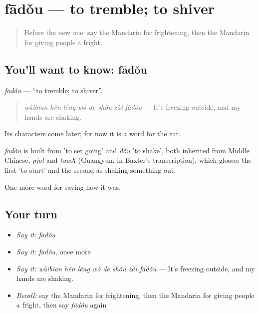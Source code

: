 \section[fādǒu]{fādǒu — to tremble; to shiver}

\label{lesson:ZH-C463-fadou}



\begin{quote}
Before the new one: say the Mandarin for frightening, then the Mandarin for giving people a fright.
\end{quote}

\subsection*{You'll want to know: fādǒu}
\emph{fādǒu} — \textquotedblleft{}to tremble; to shiver\textquotedblright{}.

\begin{quote}
\emph{wàibian hěn lěng wǒ de shǒu zài fādǒu} — It's freezing outside, and my hands are shaking.
\end{quote}

Its characters come later; for now it is a word for the ear.

\begin{cousinweb}
\emph{fādǒu} is built from  'to set going' and \emph{dǒu} 'to shake', both inherited from Middle Chinese, \emph{pjot} and \emph{tuwX} (Guangyun, in Baxter's transcription), which glosses the first 'to start' and the second as shaking something out.
\end{cousinweb}

\begin{grammarlens}[title={What you've built}]
One more word for saying how it was.
\end{grammarlens}

\subsection*{Your turn}
\begin{itemize}
\raggedright
  \item \emph{Say it:} \emph{fādǒu}
  \item \emph{Say it:} \emph{fādǒu}, once more
  \item \emph{Say it:} \emph{wàibian hěn lěng wǒ de shǒu zài fādǒu} — It's freezing outside, and my hands are shaking.
  \item \emph{Recall:} say the Mandarin for frightening, then the Mandarin for giving people a fright, then say \emph{fādǒu} again
\end{itemize}

